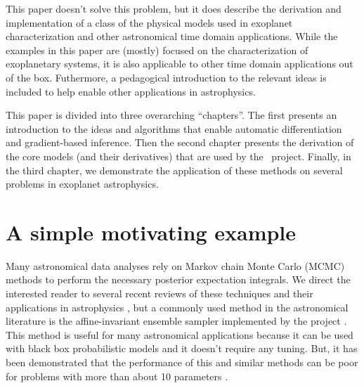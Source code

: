 \documentclass[modern]{aastex62}
\begin{document}
This paper doesn't solve this problem, but it does describe the derivation and implementation of a class of the physical models used in exoplanet characterization and other astronomical time domain applications.
While the examples in this paper are (mostly) focused on the characterization of exoplanetary systems, it is also applicable to other time domain applications out of the box.
Futhermore, a pedagogical introduction to the relevant ideas is included to help enable other applications in astrophysics.

This paper is divided into three overarching ``chapters''.
The first presents an introduction to the ideas and algorithms that enable automatic differentiation and gradient-based inference.
Then the second chapter presents the derivation of the core models (and their derivatives) that are used by the \exoplanet\ project.
Finally, in the third chapter, we demonstrate the application of these methods on several problems in exoplanet astrophysics.



\section{A simple motivating example}

Many astronomical data analyses rely on Markov chain Monte Carlo (MCMC) methods to perform the necessary posterior expectation integrals.
We direct the interested reader to several recent reviews of these techniques and their applications in astrophysics \citep{Sharma:2017, Hogg:2018}, but a commonly used method in the astronomical literature is the affine-invariant ensemble sampler implemented by the  project \citep{Goodman:2010, Foreman-Mackey:2013, Foreman-Mackey:2019a}.
This method is useful for many astronomical applications because it can be used with black box probabilistic models and it doesn't require any tuning.
But, it has been demonstrated that the performance of this and similar methods can be poor for problems with more than about 10 parameters \citep[][for example]{Huijser:2015}.
\end{document}
